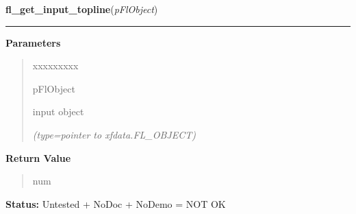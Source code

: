 \hspace{.8\funcindent}\begin{boxedminipage}{\funcwidth}

    \raggedright \textbf{fl\_get\_input\_topline}(\textit{pFlObject})

    \vspace{-1.5ex}

    \rule{\textwidth}{0.5\fboxrule}
\setlength{\parskip}{2ex}
\setlength{\parskip}{1ex}
      \textbf{Parameters}
      \vspace{-1ex}

      \begin{quote}
        \begin{Ventry}{xxxxxxxxx}

          \item[pFlObject]

          input object

            {\it (type=pointer to xfdata.FL\_OBJECT)}

        \end{Ventry}

      \end{quote}

      \textbf{Return Value}
    \vspace{-1ex}

      \begin{quote}
      num

      \end{quote}

\textbf{Status:} Untested + NoDoc + NoDemo = NOT OK



    \end{boxedminipage}

    \label{xformslib:flinput:fl_get_input_screenlines}

    \vspace{0.5ex}

